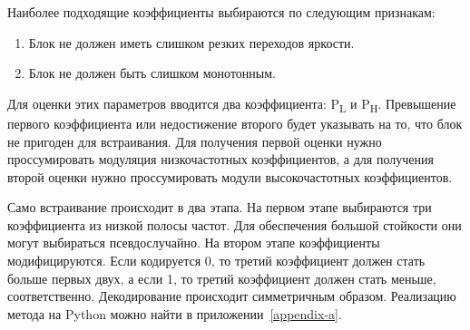 Наиболее подходящие коэффициенты выбираются по следующим признакам:
\begin{enumerate}
    \item Блок не должен иметь слишком резких переходов яркости.
    \item Блок не должен быть слишком монотонным.
\end{enumerate}
Для оценки этих параметров вводится два коэффициента: P\textsubscript{L} и P\textsubscript{H}.
Превышение первого коэффициента или недостижение второго будет указывать на то,
что блок не пригоден для встраивания. Для получения первой оценки нужно проссумировать модуляция
низкочастотных коэффициентов, а для получения второй оценки нужно проссумировать модули высокочастотных
коэффициентов.

Само встраивание происходит в два этапа.
На первом этапе выбираются три коэффициента из низкой полосы частот.
Для обеспечения большой стойкости они могут выбираться псевдослучайно.
На втором этапе коэффициенты модифицируются. Если кодируется 0,
то третий коэффициент должен стать больше первых двух, а если 1,
то третий коэффициент должен стать меньше, соответственно.
Декодирование происходит симметричным образом. Реализацию метода на Python
можно найти в приложении~\ref{appendix-a}.